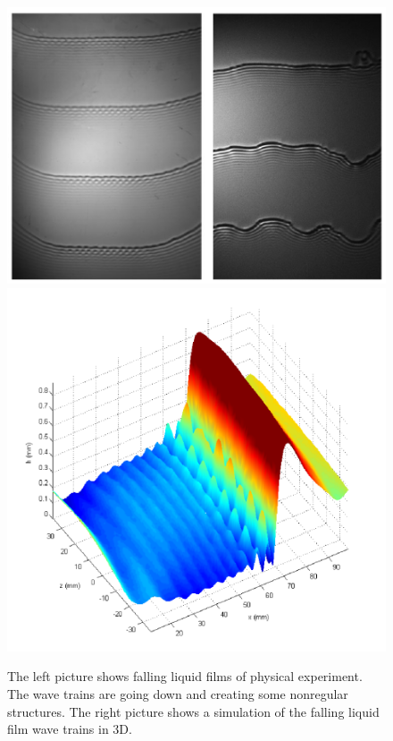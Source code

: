 \documentclass[10pt,fleqn, %
reqno,a4paper]{article}
\begin{document}
\begin{figure}[htp!]
        \begin{center}
                \includegraphics[scale=0.7]{secondary-3d-instabilities.png}
                \includegraphics[scale=0.5]{modulated-fast-wave.png}
        \end{center}
        \caption{The left picture shows falling liquid films of physical experiment. The wave trains are going down and creating some nonregular structures.\cite{miyara_numerical_2000} The right picture shows a simulation of the falling liquid film wave trains in 3D. \cite{ruyer-quil_dynamics_2014}}
        \label{pic:fastwave}
\end{figure}
\end{document}
